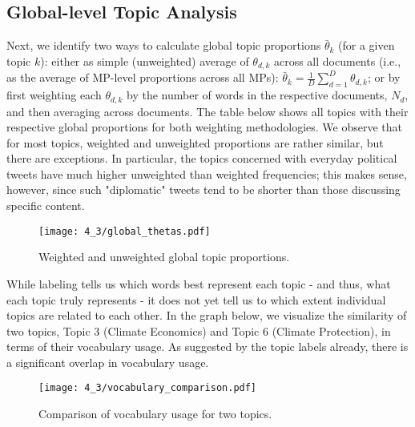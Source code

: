 \documentclass[12pt]{article}
\begin{document}
\subsection{Global-level Topic Analysis}

Next, we identify two ways to calculate global topic proportions $\bar{\theta}_k$ (for a given topic $k$): either as simple (unweighted) average of $\theta_{d,k}$ across all documents (i.e., as the average of MP-level proportions across all MPs): $\bar{\theta}_k = \frac{1}{D}\sum_{d=1}^{D}\theta_{d,k}$; or by first weighting each $\theta_{d,k}$ by the number of words in the respective documents, $N_d$, and then averaging across documents. The table below shows all topics with their respective global proportions for both weighting methodologies. We observe that for most topics, weighted and unweighted proportions are rather similar, but there are exceptions. In particular, the topics concerned with everyday political tweets have much higher unweighted than weighted frequencies; this makes sense, however, since such "diplomatic" tweets tend to be shorter than those discussing specific content.

\begin{figure}[h!]
  \centering
  \captionsetup{justification=centering,margin=2cm}
  \texttt{[image: 4\_3/global\_thetas.pdf]}
  \caption{Weighted and unweighted global topic proportions.}
  \label{fig:global_thetas}
\end{figure}

While labeling tells us which words best represent each topic - and thus, what each topic truly represents - it does not yet tell us to which extent individual topics are related to each other. In the graph below, we visualize the similarity of two topics, Topic 3 (Climate Economics) and Topic 6 (Climate Protection), in terms of their vocabulary usage. As suggested by the topic labels already, there is a significant overlap in vocabulary usage.

\begin{figure}[h!]
  \centering
  \captionsetup{justification=centering,margin=2cm}
  \texttt{[image: 4\_3/vocabulary\_comparison.pdf]}
  \caption{Comparison of vocabulary usage for two topics.}
  \label{fig:vocabulary_comparison}
\end{figure}
\end{document}

